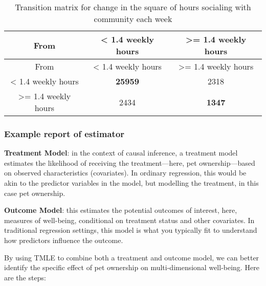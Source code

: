 \documentclass[
  singlecolumn]{article}
\begin{document}
\begin{longtable}[]{@{}ccc@{}}
\caption{Transition matrix for change in the square of hours socialing
with community each
week}\label{tbl-transition-socialising-shift}\tabularnewline
\toprule\noalign{}
From & \textless{} 1.4 weekly hours & \textgreater= 1.4 weekly hours \\
\midrule\noalign{}
\endfirsthead
\toprule\noalign{}
From & \textless{} 1.4 weekly hours & \textgreater= 1.4 weekly hours \\
\midrule\noalign{}
\endhead
\bottomrule\noalign{}
\endlastfoot
\textless{} 1.4 weekly hours & \textbf{25959} & 2318 \\
\textgreater= 1.4 weekly hours & 2434 & \textbf{1347} \\
\end{longtable}

\subsubsection{Example report of
estimator}\label{example-report-of-estimator}

\textbf{Treatment Model}: in the context of causal inference, a
treatment model estimates the likelihood of receiving the
treatment---here, pet ownership---based on observed characteristics
(covariates). In ordinary regression, this would be akin to the
predictor variables in the model, but modelling the treatment, in this
case pet ownership.

\textbf{Outcome Model}: this estimates the potential outcomes of
interest, here, measures of well-being, conditional on treatment status
and other covariates. In traditional regression settings, this model is
what you typically fit to understand how predictors influence the
outcome.

By using TMLE to combine both a treatment and outcome model, we can
better identify the specific effect of pet ownership on
multi-dimensional well-being. Here are the steps:
\end{document}
